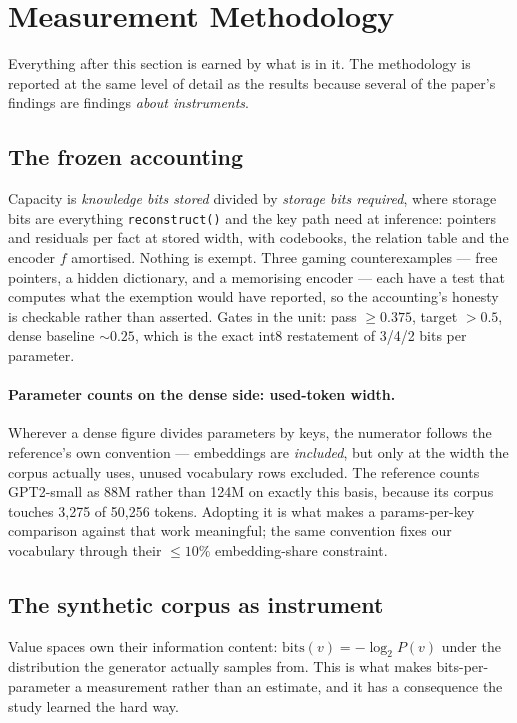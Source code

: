 \section{Measurement Methodology}
\label{sec:method}

Everything after this section is earned by what is in it. The methodology is reported at the same
level of detail as the results because several of the paper's findings are findings \emph{about
instruments}.

\subsection{The frozen accounting}

Capacity is \emph{knowledge bits stored} divided by \emph{storage bits required}, where storage bits
are everything \texttt{reconstruct()} and the key path need at inference: pointers and residuals per
fact at stored width, with codebooks, the relation table and the encoder $f$ amortised. Nothing is
exempt.
Three gaming counterexamples --- free pointers, a hidden dictionary, and a memorising encoder ---
each have a test that computes what the exemption would have reported, so the accounting's honesty
is checkable rather than asserted. Gates in the unit: pass $\ge 0.375$, target $> 0.5$, dense
baseline $\sim 0.25$, which is the exact int8 restatement of 3/4/2 bits per parameter.

\paragraph{Parameter counts on the dense side: used-token width.} Wherever a dense figure divides
parameters by keys, the numerator follows the reference's own convention --- embeddings are
\emph{included}, but only at the width the corpus actually uses, unused vocabulary rows excluded.
The reference counts GPT2-small as 88M rather than 124M on exactly this basis, because its corpus
touches 3{,}275 of 50{,}256 tokens. Adopting it is what makes a params-per-key comparison against
that work meaningful; the same convention fixes our vocabulary through their
$\le 10\%$ embedding-share constraint.

\subsection{The synthetic corpus as instrument}

Value spaces own their information content: $\mathrm{bits}(v) = -\log_2 P(v)$ under the distribution
the generator actually samples from. This is what makes bits-per-parameter a measurement rather than
an estimate, and it has a consequence the study learned the hard way.

